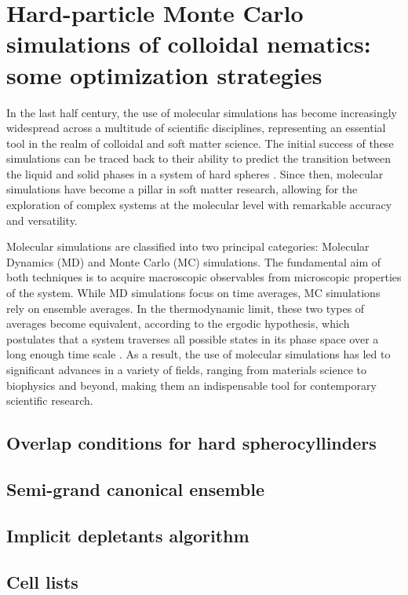 \section[HPMC simulations of colloidal nematics]{Hard-particle Monte Carlo simulations of colloidal nematics: some optimization strategies}

In the last half century, the use of molecular simulations has become increasingly widespread across a multitude of scientific disciplines, representing an essential tool in the realm of colloidal and soft matter science. The initial success of these simulations can be traced back to their ability to predict the transition between the liquid and solid phases in a system of hard spheres \cite{ALDER57,WOOD57}. Since then, molecular simulations have become a pillar in soft matter research, allowing for the exploration of complex systems at the molecular level with remarkable accuracy and versatility.

Molecular simulations are classified into two principal categories: Molecular Dynamics (MD) and Monte Carlo (MC) simulations. The fundamental aim of both techniques is to acquire macroscopic observables from microscopic properties of the system. While MD simulations focus on time averages, MC simulations rely on ensemble averages. In the thermodynamic limit, these two types of averages become equivalent, according to the ergodic hypothesis, which postulates that a system traverses all possible states in its phase space over a long enough time scale \cite{dfrenkel96:mc}. As a result, the use of molecular simulations has led to significant advances in a variety of fields, ranging from materials science to biophysics and beyond, making them an indispensable tool for contemporary scientific research.

\subsection{Overlap conditions for hard spherocyllinders}

\subsection{Semi-grand canonical ensemble}

\subsection{Implicit depletants algorithm}

\subsection{Cell lists}

\clearpage